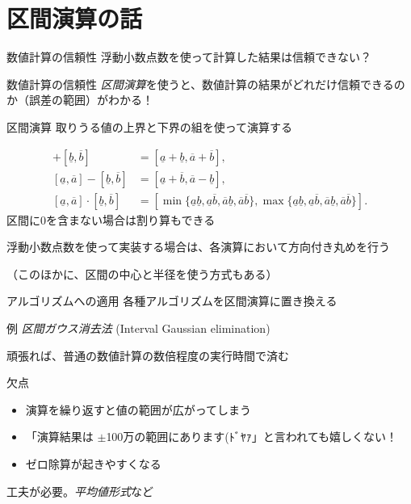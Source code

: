 \documentclass[aspectratio=169]{beamer}
\newcommand{\ub}[1]{\overline{#1}}
\newcommand{\lb}[1]{\underline{#1}}
\begin{document}
\section{区間演算の話}
\begin{frame}{数値計算の信頼性}
  浮動小数点数を使って計算した結果は信頼できない？
\end{frame}
\begin{frame}{数値計算の信頼性}
  \emph{区間演算}を使うと、数値計算の結果がどれだけ信頼できるのか（誤差の範囲）がわかる！
\end{frame}
\begin{frame}{区間演算}
  取りうる値の上界と下界の組を使って演算する

  \begin{align*}
    [\lb{a},\ub{a}]+[\lb{b},\ub{b}]&=[\lb{a}+\lb{b},\ub{a}+\ub{b}], \\
    [\lb{a},\ub{a}]-[\lb{b},\ub{b}]&=[\lb{a}+\ub{b},\ub{a}-\lb{b}], \\
    [\lb{a},\ub{a}]\cdot[\lb{b},\ub{b}]&=[\min\{\lb{a}\lb{b},\lb{a}\ub{b},\ub{a}\lb{b},\ub{a}\ub{b}\},\max\{\lb{a}\lb{b},\lb{a}\ub{b},\ub{a}\lb{b},\ub{a}\ub{b}\}].
  \end{align*}
  区間に0を含まない場合は割り算もできる

  浮動小数点数を使って実装する場合は、各演算において方向付き丸めを行う

  （このほかに、区間の中心と半径を使う方式もある）
\end{frame}
\begin{frame}{アルゴリズムへの適用}
  各種アルゴリズムを区間演算に置き換える

  \begin{block}{例}
    \emph{区間ガウス消去法} (Interval Gaussian elimination)
  \end{block}

  頑張れば、普通の数値計算の数倍程度の実行時間で済む
\end{frame}
\begin{frame}{欠点}
  \begin{itemize}
  \item 演算を繰り返すと値の範囲が広がってしまう
  \item 「演算結果は $\pm$100万の範囲にあります(ﾄﾞﾔｧ」と言われても嬉しくない！
  \item ゼロ除算が起きやすくなる
  \end{itemize}

  工夫が必要。\emph{平均値形式}など
\end{frame}
\end{document}
